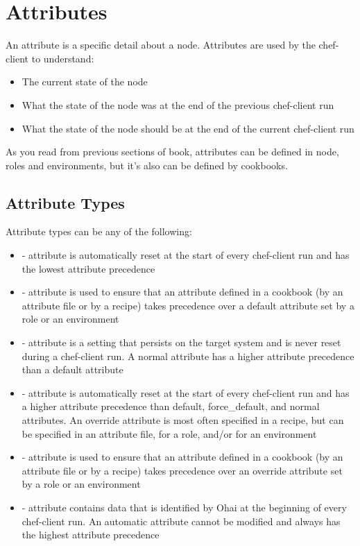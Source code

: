 \section{Attributes}
\label{sec:server-attributes}

An attribute is a specific detail about a node. Attributes are used by the chef-client to understand:

\begin{itemize}
  \item The current state of the node
  \item What the state of the node was at the end of the previous chef-client run
  \item What the state of the node should be at the end of the current chef-client run
\end{itemize}

As you read from previous sections of book, attributes can be defined in node, roles and environments, but it's also can be defined by cookbooks.

\subsection{Attribute Types}

Attribute types can be any of the following:

\begin{itemize}
  \item {} - attribute is automatically reset at the start of every chef-client run and has the lowest attribute precedence
  \item {} - attribute is used to ensure that an attribute defined in a cookbook (by an attribute file or by a recipe) takes precedence over a default attribute set by a role or an environment
  \item {} - attribute is a setting that persists on the target system and is never reset during a chef-client run. A normal attribute has a higher attribute precedence than a default attribute
  \item {} - attribute is automatically reset at the start of every chef-client run and has a higher attribute precedence than default, force\_default, and normal attributes. An override attribute is most often specified in a recipe, but can be specified in an attribute file, for a role, and/or for an environment
  \item {} - attribute is used to ensure that an attribute defined in a cookbook (by an attribute file or by a recipe) takes precedence over an override attribute set by a role or an environment
  \item {} - attribute contains data that is identified by Ohai at the beginning of every chef-client run. An automatic attribute cannot be modified and always has the highest attribute precedence
\end{itemize}

